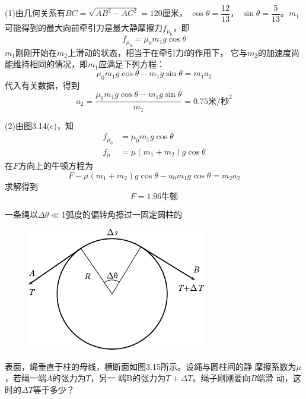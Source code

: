(1)由几何关系$ 有 B C = \sqrt { A B ^ { 2 } - A C ^ { 2 } } = 1 2 0  $厘米，
$ \cos \theta = \dfrac { 1 2 } { 1 3 } $，
$ \sin \theta = \dfrac { 5 } { 1 3 } $。$ m _ { 1 }  $
可能得到的最大向前牵引力是最大静摩擦力$  f _ { \mu _ 0 }  $，即
\clearpage
~\vspace{-1.56em}
\begin{equation*}
	f _ {\mu _ 0 } = \mu _ { 0 } m _ { 1 } g \cos \theta
\end{equation*}
$m_1$刚刚开始在$m_2$上滑动的状态，相当于在牵引力f的作用下，
它与$m_2$的加速度尚能维持相同的情况，即$m_1$应满足下列方程：
\begin{equation*}
	\mu _ { 0 } m _ { 1 } g \cos \theta - m _ { 1 } g \sin \theta = m _ { 1 } a _ { 2 }
\end{equation*}
代入有关数据，得到
\begin{equation*}
	a _ { 2 } = \frac { \mu_{ 0 } m_1 g \cos \theta - m _ { 1 } g \sin \theta } { m _ { 1 } } = 0 . 7 5 \text{米/秒}^2
\end{equation*}

(2)由图3.14(c)，知
\begin{align*}
	f _ { \mu _ 0 } &= \mu _ { 0 } m _ { 1 } g \cos \theta \\
    f _ { \mu } &= \mu ( m _ { 1 } + m _ { 2 } ) g \cos \theta
\end{align*}
在$ F $方向上的牛顿方程为
\begin{equation*}
    F - \mu ( m _ { 1 } + m _ { 2 } ) g \cos \theta - u _ { 0 } m _ { 1 } g \cos \theta = m _ { 2 } a _ { 2 }
\end{equation*}
求解得到
\begin{equation*}
    F = 1 . 9 6 \text{牛顿}
\end{equation*}

\example 一条绳以$  \Delta \theta \ll 1  $弧度的偏转角擦过一固定圆柱的
\begin{figure}
	\centering
	\includegraphics{figure/fig03.15}
	\caption{}
	\label{fig:03.15}
\end{figure}
表面，绳垂直于柱的母线，横断面如图3.15所示。设绳与圆柱间的静
摩擦系数为$\mu$，若绳一端$ A $的张力为$ T $，另一
端B的张力为$  T + \Delta T $。绳子刚刚要向$ B $端滑
动，这时的$  \Delta T  $等于多少？


